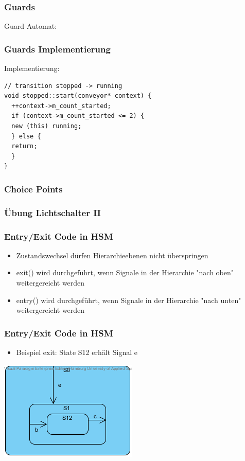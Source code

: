 \documentclass{beamer}
\begin{document}
\begin{frame}
 \frametitle{Guards}
 Guard Automat:
\end{frame}

\begin{frame}[fragile]
 \frametitle{Guards Implementierung}
 Implementierung:
  \begin{lstlisting}
// transition stopped -> running
void stopped::start(conveyor* context) {
  ++context->m_count_started;
  if (context->m_count_started <= 2) {
  new (this) running;
  } else {
  return;
  }
}
  \end{lstlisting}
\end{frame}

\begin{frame}
 \frametitle{Choice Points}
\end{frame}

\begin{frame}
 \frametitle{\"Ubung Lichtschalter II}
\end{frame}

\begin{frame}
  \frametitle{Entry/Exit Code in HSM }
  \begin{itemize}
  \item Zustandswechsel d\"urfen Hierarchieebenen nicht \"uberspringen
  \item exit() wird durchgef\"uhrt, wenn Signale in der Hierarchie "nach oben" weitergereicht werden
  \item entry() wird  durchgef\"uhrt, wenn Signale in der Hierarchie "nach unten" weitergereicht werden
  \end{itemize}
\end{frame}

\begin{frame}
  \frametitle{Entry/Exit Code in HSM }
  \begin{itemize}
  \item Beispiel exit: State S12 erh\"alt Signal e
  \end{itemize}
  \includegraphics[scale=.6]{img/beispiel_exitSM}
\end{frame}
\end{document}
